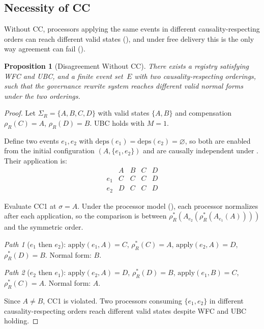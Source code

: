 \documentclass[11pt,a4paper]{article}
\theoremstyle{plain}
\newtheorem{proposition}[theorem]{Proposition}
\theoremstyle{definition}
\theoremstyle{remark}
\begin{document}
\subsection{Necessity of CC}

Without CC, processors applying the same events in different
causality-respecting orders can reach different valid states
(), and under free delivery this is the only way
agreement can fail ().

\begin{proposition}[Disagreement Without CC]
\label{prop:cc-necessary}
There exists a registry satisfying WFC and UBC, and a finite event set~$E$
with two causality-respecting orderings, such that the governance rewrite
system reaches different valid normal forms under the two orderings.
\end{proposition}

\begin{proof}
Let $\Sigma_R = \{A, B, C, D\}$ with valid states $\{A, B\}$ and
compensation $\rho_R(C) = A$, $\rho_R(D) = B$.  UBC holds with $M = 1$.

Define two events $e_1, e_2$ with $\mathrm{deps}(e_1) = \mathrm{deps}(e_2) =
\varnothing$, so both are enabled from the initial configuration
$(A, \{e_1, e_2\})$ and are causally independent under
.  Their application is:
\[
\begin{array}{c|cccc}
  & A & B & C & D \\ \hline
e_1 & C & C & C & D \\
e_2 & D & C & C & D
\end{array}
\]

Evaluate CC1 at $\sigma = A$.  Under the processor model
(), each processor normalizes after each application,
so the comparison is between $\rho_R^*(A_{e_2}(\rho_R^*(A_{e_1}(A))))$ and
the symmetric order.

\emph{Path 1} ($e_1$ then $e_2$): $\mathrm{apply}(e_1, A) = C$,
$\rho_R^*(C) = A$, $\mathrm{apply}(e_2, A) = D$, $\rho_R^*(D) = B$.
Normal form: $B$.

\emph{Path 2} ($e_2$ then $e_1$): $\mathrm{apply}(e_2, A) = D$,
$\rho_R^*(D) = B$, $\mathrm{apply}(e_1, B) = C$, $\rho_R^*(C) = A$.
Normal form: $A$.

Since $A \neq B$, CC1 is violated.  Two processors consuming
$\{e_1, e_2\}$ in different causality-respecting orders reach different valid
states despite WFC and UBC holding.
\end{proof}
\end{document}
